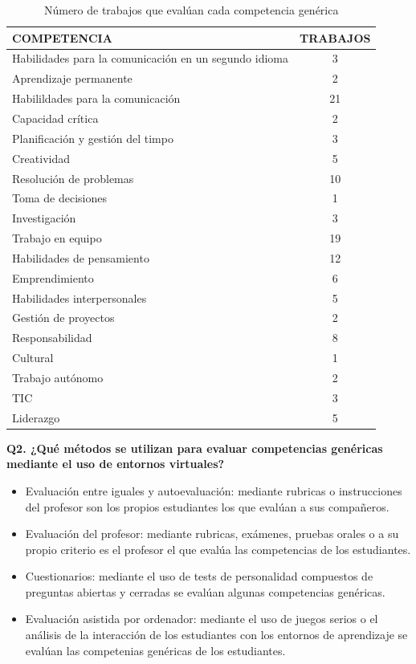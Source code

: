 \begin{table}
  \begin{center}
  \begin{tabular}{| m{10cm} | c |}
    \hline
    COMPETENCIA & TRABAJOS\\
    \hline
    \hline 
    Habilidades para la comunicación en un segundo idioma & 3\\
    \hline
    Aprendizaje permanente & 2\\
    \hline
    Habilildades para la comunicación & 21\\
    \hline
    Capacidad crítica & 2\\
    \hline
    Planificación y gestión del timpo & 3\\
    \hline
    Creatividad & 5\\
    \hline
    Resolución de problemas & 10\\
    \hline
    Toma de decisiones & 1\\
    \hline
    Investigación & 3\\
    \hline
    Trabajo en equipo & 19\\
    \hline
    Habilidades de pensamiento & 12\\
    \hline
    Emprendimiento & 6\\
    \hline
    Habilidades interpersonales & 5\\
    \hline
    Gestión de proyectos & 2\\
    \hline
    Responsabilidad & 8\\
    \hline
    Cultural & 1\\
    \hline
    Trabajo autónomo & 2\\
    \hline
    TIC & 3\\
    \hline
    Liderazgo & 5\\
    \hline
  \end{tabular}
\end{center}
\caption{Número de trabajos que evalúan cada competencia genérica}
\label{tab:TrabajosCompetencia}
\end{table} 

\bigskip
\textbf{Q2. ¿Qué métodos se utilizan para evaluar competencias genéricas mediante el uso de entornos virtuales?}

\begin{itemize}
\item Evaluación entre iguales y autoevaluación: mediante rubricas o instrucciones del profesor son los propios estudiantes los que evalúan a sus compañeros.
\item Evaluación del profesor: mediante rubricas, exámenes, pruebas orales o a su propio criterio es el profesor el que evalúa las competencias de los estudiantes.
\item Cuestionarios: mediante el uso de tests de personalidad compuestos de preguntas abiertas y cerradas se evalúan algunas competencias genéricas.
\item Evaluación asistida por ordenador: mediante el uso de juegos serios o el análisis de la interacción de los estudiantes con los entornos de aprendizaje se evalúan las competenias genéricas de los estudiantes.
\end{itemize}

